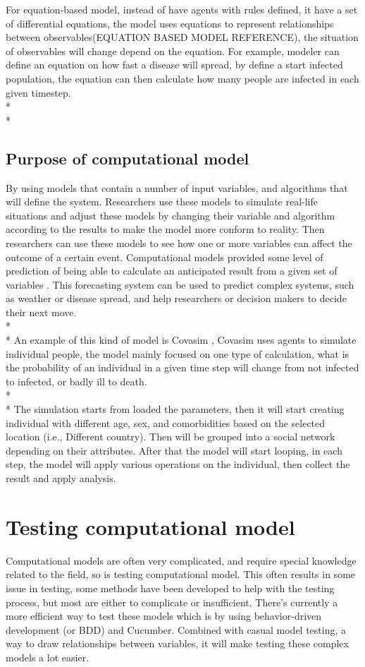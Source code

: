 For equation-based model, instead of have agents with rules defined, it have a set of differential equations, the model uses equations to represent relationships between observables(EQUATION BASED MODEL REFERENCE), the situation of observables will change depend on the equation. For example, modeler can define an equation on how fast a disease will spread, by define a start infected population, the equation can then calculate how many people are infected in each given timestep. \\*\\*

\subsection{Purpose of computational model}
By using models that contain a number of input variables, and algorithms that will define the system. Researchers use these models to simulate real-life situations and adjust these models by changing their variable and algorithm according to the results to make the model more conform to reality. Then researchers can use these models to see how one or more variables can affect the outcome of a certain event. Computational models provided some level of prediction of being able to calculate an anticipated result from a given set of variables \cite{Reference4}. This forecasting system can be used to predict complex systems, such as weather or disease spread, and help researchers or decision makers to decide their next move.\\*\\*
An example of this kind of model is Covasim \cite{Reference5}, Covasim uses agents to simulate individual people, the model mainly focused on one type of calculation, what is the probability of an individual in a given time step will change from not infected to infected, or badly ill to death. \\*\\*
The simulation starts from loaded the parameters, then it will start creating individual with different age, sex, and comorbidities based on the selected location (i.e., Different country). Then will be grouped into a social network depending on their attributes. After that the model will start looping, in each step, the model will apply various operations on the individual, then collect the result and apply analysis.

\section{Testing computational model}
Computational models are often very complicated, and require special knowledge related to the field, so is testing computational model. This often results in some issue in testing, some methods have been developed to help with the testing process, but most are either to complicate or insufficient. There’s currently a more efficient way to test these models which is by using behavior-driven development (or BDD) and Cucumber. Combined with casual model testing, a way to draw relationships between variables, it will make testing these complex models a lot easier.

